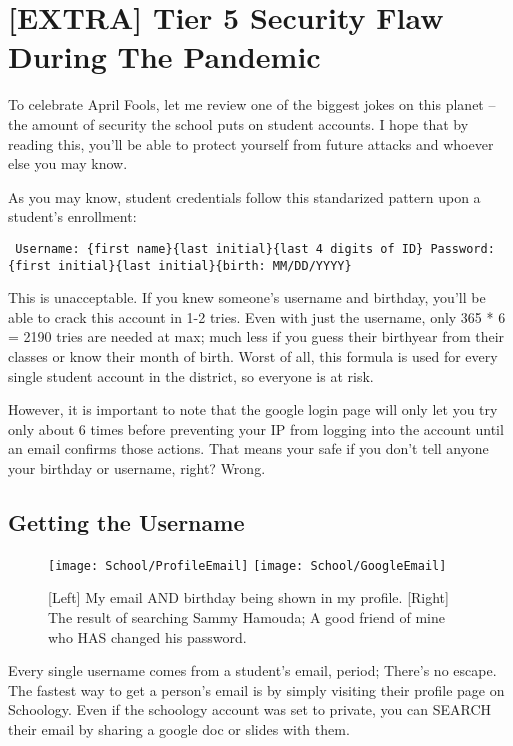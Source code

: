 \section{[EXTRA] Tier 5 Security Flaw During The Pandemic}

To celebrate April Fools, let me review one of the biggest jokes on this planet -- the amount of security the school puts on student accounts. I hope that by reading this, you'll be able to protect yourself from future attacks and whoever else you may know.

As you may know, student credentials follow this standarized pattern upon a student's enrollment:

\begin{centering}
\texttt{
Username: \{first name\}\{last initial\}\{last 4 digits of ID\} \newline
Password: \{first initial\}\{last initial\}\{birth: MM/DD/YYYY\}
}
\end{centering}

This is unacceptable. If you knew someone's username and birthday, you'll be able to crack this account in 1-2 tries. Even with just the username, only 365 * 6 = 2190 tries are needed at max; much less if you guess their birthyear from their classes or know their month of birth. Worst of all, this formula is used for every single student account in the district, so everyone is at risk.

However, it is important to note that the google login page will only let you try only about 6 times before preventing your IP from logging into the account until an email confirms those actions. That means your safe if you don't tell anyone your birthday or username, right? Wrong.

\subsection{Getting the Username}


\begin{figure}[h]
    \centering
    \texttt{[image: School/ProfileEmail]}
    \texttt{[image: School/GoogleEmail]}
    \caption{
        [Left] My email AND birthday being shown in my profile. [Right] The result of searching Sammy Hamouda; A good friend of mine who HAS changed his password.
    }
\end{figure}

Every single username comes from a student's email, period; There's no escape. The fastest way to get a person's email is by simply visiting their profile page on Schoology. Even if the schoology account was set to private, you can SEARCH their email by sharing a google doc or slides with them.

